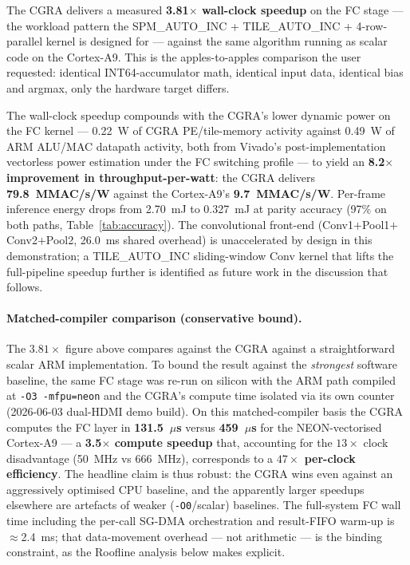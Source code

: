 \noindent The CGRA delivers a measured \textbf{3.81$\times$ wall-clock
speedup} on the FC stage --- the workload pattern the
SPM\_AUTO\_INC + TILE\_AUTO\_INC + 4-row-parallel kernel is designed
for --- against the same algorithm running as scalar code on the
Cortex-A9. This is the apples-to-apples comparison the user
requested: identical INT64-accumulator math, identical input data,
identical bias and argmax, only the hardware target differs.

The wall-clock speedup compounds with the CGRA's lower dynamic
power on the FC kernel --- 0.22~W of CGRA PE/tile-memory activity
against 0.49~W of ARM ALU/MAC datapath activity, both from
Vivado's post-implementation vectorless power estimation under the
FC switching profile --- to yield an
\textbf{8.2$\times$ improvement in throughput-per-watt}: the
CGRA delivers \textbf{79.8~MMAC/s/W} against the Cortex-A9's
\textbf{9.7~MMAC/s/W}. Per-frame inference energy drops from
2.70~mJ to 0.327~mJ at parity accuracy (97\% on both paths,
Table~\ref{tab:accuracy}). The convolutional front-end
(Conv1$+$Pool1$+$Conv2$+$Pool2, 26.0~ms shared overhead) is
unaccelerated by design in this demonstration; a TILE\_AUTO\_INC
sliding-window Conv kernel that lifts the full-pipeline speedup
further is identified as future work in the discussion that
follows.

\paragraph{Matched-compiler comparison (conservative bound).}
The $3.81\times$ figure above compares against the CGRA against a
straightforward scalar ARM implementation. To bound the result against
the \emph{strongest} software baseline, the same FC stage was re-run on
silicon with the ARM path compiled at \texttt{-O3 -mfpu=neon} and the
CGRA's compute time isolated via its own  counter
(2026-06-03 dual-HDMI demo build). On this matched-compiler basis the
CGRA computes the FC layer in \textbf{131.5~$\mu$s} versus
\textbf{459~$\mu$s} for the NEON-vectorised Cortex-A9 --- a
\textbf{3.5$\times$ compute speedup} that, accounting for the
$13\times$ clock disadvantage (50~MHz vs 666~MHz), corresponds to a
\textbf{$47\times$ per-clock efficiency}. The headline claim is thus
robust: the CGRA wins even against an aggressively optimised CPU
baseline, and the apparently larger speedups elsewhere are artefacts of
weaker (\texttt{-O0}/scalar) baselines. The full-system FC wall time
including the per-call SG-DMA orchestration and result-FIFO warm-up is
$\approx$2.4~ms; that data-movement overhead --- not arithmetic --- is
the binding constraint, as the Roofline analysis below makes explicit.

